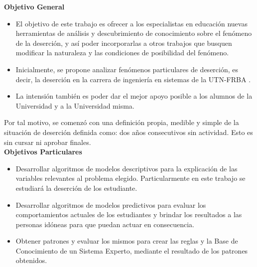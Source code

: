 
\textbf{Objetivo General}\\
\begin{itemize}
	\item El objetivo de este trabajo es ofrecer a los especialistas en educación nuevas herramientas de análisis y descubrimiento de conocimiento sobre el fenómeno de la deserción, y así poder incorporarlas a otros trabajos que busquen modificar la naturaleza y las condiciones de posibilidad del fenómeno.
	\item Inicialmente, se propone analizar fenómenos particulares de deserción, es decir, la deserción en la carrera de ingeniería en sistemas de la UTN-FRBA .
	\item La intensión también es poder dar el mejor apoyo posible a los alumnos de la Universidad y a la Universidad misma.
\end{itemize}

Por tal motivo, se comenzó con una definición propia, medible y
simple de la situación de deserción definida como: dos años consecutivos sin actividad. Esto es sin cursar ni aprobar finales.\\



\textbf{Objetivos Particulares}
\begin{itemize}
	\item Desarrollar algoritmos de modelos descriptivos para la explicación de las variables relevantes al problema elegido. Particularmente en este trabajo se estudiará la deserción de los estudiante.
	\item Desarrollar algoritmos de modelos predictivos para evaluar los comportamientos actuales de los estudiantes y brindar los resultados a las personas idóneas para que puedan actuar en consecuencia.
	\item Obtener patrones y evaluar los mismos para crear las reglas y la Base de Conocimiento de un Sistema Experto, mediante el resultado de los patrones obtenidos.
\end{itemize}




